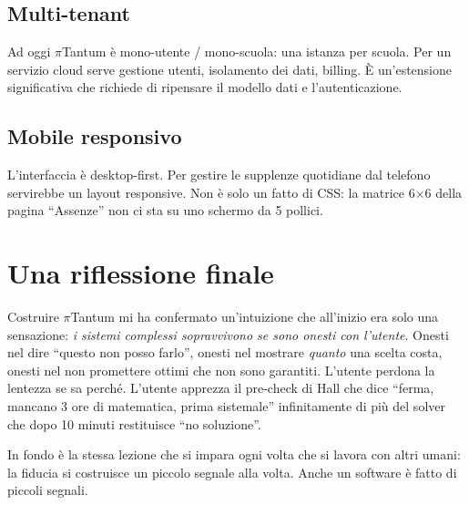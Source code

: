 \subsection{Multi-tenant}

Ad oggi $\pi$Tantum \`e mono-utente / mono-scuola: una
istanza per scuola. Per un servizio cloud serve gestione
utenti, isolamento dei dati, billing. \`E un'estensione
significativa che richiede di ripensare il modello dati e
l'autenticazione.

\subsection{Mobile responsivo}

L'interfaccia \`e desktop-first. Per gestire le supplenze
quotidiane dal telefono servirebbe un layout responsive. Non
\`e solo un fatto di CSS: la matrice 6$\times$6 della pagina
``Assenze'' non ci sta su uno schermo da 5 pollici.

\section{Una riflessione finale}

Costruire $\pi$Tantum mi ha confermato un'intuizione che
all'inizio era solo una sensazione: \emph{i sistemi
complessi sopravvivono se sono onesti con l'utente}. Onesti
nel dire ``questo non posso farlo'', onesti nel mostrare
\emph{quanto} una scelta costa, onesti nel non promettere
ottimi che non sono garantiti. L'utente perdona la lentezza
se sa perch\'e. L'utente apprezza il pre-check di Hall che
dice ``ferma, mancano 3 ore di matematica, prima sistemale''
infinitamente di pi\`u del solver che dopo 10 minuti
restituisce ``no soluzione''.

In fondo \`e la stessa lezione che si impara ogni volta che
si lavora con altri umani: la fiducia si costruisce un
piccolo segnale alla volta. Anche un software \`e fatto di
piccoli segnali.

